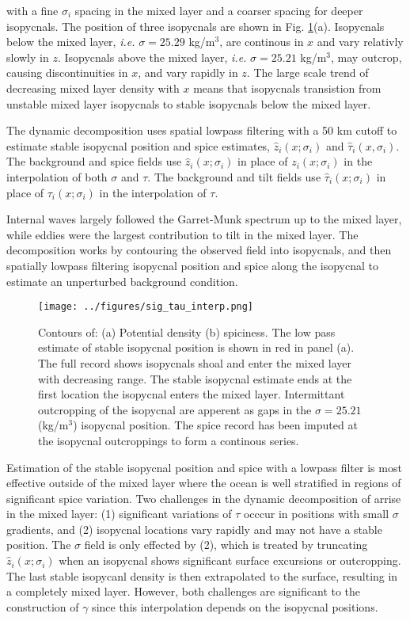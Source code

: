 \documentclass[preprint]{JASA}
\begin{document}
with a fine $\sigma_i$ spacing in the mixed layer and a coarser spacing for deeper isopycnals. The position of three isopycnals are shown in Fig. \ref{fig:cntrs}(a). Isopycnals below the mixed layer, \emph{i.e.} $\sigma = 25.29$ kg/m$^3$, are continous in $x$ and vary relativly slowly in $z$. Isopycnals above the mixed layer, \emph{i.e.} $\sigma = 25.21$ kg/m$^3$, may outcrop, causing discontinuities in $x$, and vary rapidly in $z$. The large scale trend of decreasing mixed layer density with $x$ means that isopycnals transistion from unstable mixed layer isopycnals to stable isopycnals below the mixed layer.

The dynamic decomposition uses spatial lowpass filtering with a 50 km cutoff to estimate stable isopycnal position and spice estimates, $\hat{z}_i(x; \sigma_i)$ and $\hat{\tau}_i(x, \sigma_i)$. The background and spice fields use $\hat{z}_i(x; \sigma_i)$ in place of $z_i(x; \sigma_i)$ in the interpolation of both $\sigma$ and $\tau$. The background and tilt fields use $\hat{\tau}_i(x; \sigma_i)$ in place of $\tau_i(x; \sigma_i)$ in the interpolation of $\tau$.

 Internal waves largely followed the Garret-Munk spectrum up to the mixed layer, while eddies were the largest contribution to tilt in the mixed layer.  The decomposition works by contouring the observed field into isopycnals, and then spatially lowpass filtering isopycnal position and spice along the isopycnal to estimate an unperturbed background condition.

\begin{figure}
\texttt{[image: ../figures/sig\_tau\_interp.png]}
    \caption{\label{fig:cntrs}{Contours of: (a) Potential density (b) spiciness. The low pass estimate of stable isopycnal position is shown in red in panel (a). The full record shows isopycnals shoal and enter the mixed layer with decreasing range. The stable isopycnal estimate ends at the first location the isopycnal enters the mixed layer. Intermittant outcropping of the isopycnal are apperent as gaps in the $\sigma=25.21$ (kg/m$^3$) isopycnal position. The spice record has been imputed at the isopycnal outcroppings to form a continous series.}}
\end{figure}

Estimation of the stable isopycnal position and spice with a lowpass filter is most effective outside of the mixed layer where the ocean is well stratified in regions of significant spice variation. Two challenges in the dynamic decomposition of \cite{dzieciuch2004} arrise in the mixed layer: (1) significant variations of $\tau$ occcur in positions with small $\sigma$ gradients, and (2) isopycnal locations vary rapidly and may not have a stable position. The $\sigma$ field is only effected by (2), which is treated by truncating $\hat{z}_i(x; \sigma_i)$ when an isopycnal shows significant surface excursions or outcropping. The last stable isopycanl density is then extrapolated to the surface, resulting in a completely mixed layer. However, both challenges are significant to the construction of $\gamma$ since this interpolation depends on the isopycnal positions.
\end{document}
